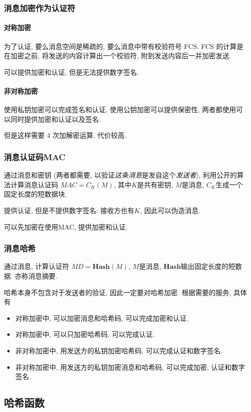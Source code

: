 \documentclass{ctexart}
\begin{document}
\subsubsection{消息加密作为认证符}
\paragraph{对称加密} 为了认证, 要么消息空间是稀疏的, 要么消息中带有校验符号 FCS.
    FCS 的计算是在加密之前, 将发送的内容计算出一个校验符, 附到发送内容后一并加密发送.\par
    可以提供加密和认证, 但是无法提供数字签名.
\paragraph{非对称加密} 使用私钥加密可以完成签名和认证, 使用公钥加密可以提供保密性,
    两者都使用可以同时提供加密和认证以及签名.\par
    但是这样需要 4 次加解密运算, 代价较高.
\subsubsection{消息认证码MAC}
    通过消息和密钥 (两者都需要, 以验证\emph{这条消息}是发自这个\emph{发送者}),
    利用公开的算法计算消息认证码 $MAC = C_K(M)$,
    其中$K$是共有密钥, $M$是消息, $C_K$生成一个固定长度的短数据块.\par
    提供认证, 但是不提供数字签名: 接收方也有$K$, 因此可以伪造消息.\par
    可以先加密在使用MAC, 提供加密和认证.
\subsubsection{消息哈希}
    通过消息, 计算认证符 $MD = \mathbf{Hash}(M)$, $M$是消息, $\mathbf{Hash}$输出固定长度的短数据. 亦称消息摘要.\par
    哈希本身不包含对于发送者的验证, 因此一定要对哈希加密. 根据需要的服务, 具体有\begin{itemize}
        \item 对称加密中, 可以加密消息和哈希码, 可以完成加密和认证.
        \item 对称加密中, 可以只加密哈希码, 可以完成认证.
        \item 非对称加密中, 用发送方的私钥加密哈希码, 可以完成认证和数字签名.
        \item 非对称加密中, 用发送方的私钥加密消息和哈希码, 可以完成加密, 认证和数字签名.
    \end{itemize}

\subsection{哈希函数}
\end{document}
